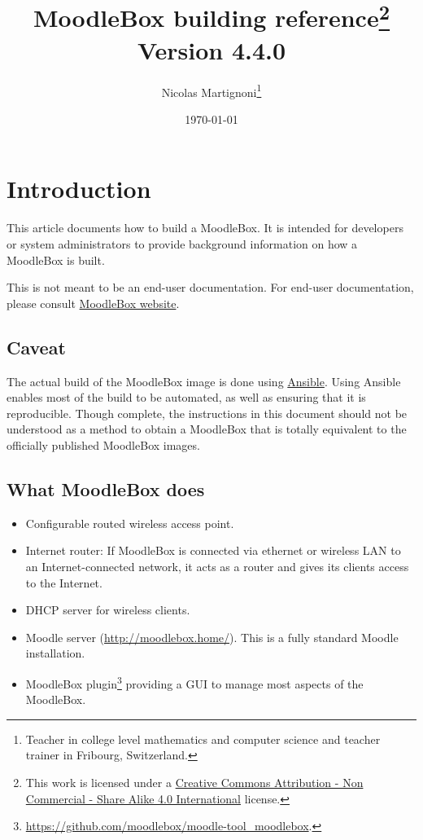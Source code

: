 \documentclass[12pt]{article}
\begin{document}
\title{MoodleBox building reference\footnote{This work is licensed under a \href{http://creativecommons.org/licenses/by-nc-sa/4.0/}{Creative Commons Attribution - Non Commercial - Share Alike  4.0 International} license.}\\
Version 4.4.0}
\date{\today} %
\author{Nicolas Martignoni\footnote{Teacher in college level mathematics and computer science and teacher trainer in Fribourg, Switzerland.}}
\maketitle

\begingroup
\setlength{\parskip}{3pt plus1pt minus1pt}
\tableofcontents
\endgroup
\clearpage

\section{Introduction}

This article documents how to build a MoodleBox.
It is intended for developers or system administrators to provide background information on how a MoodleBox is built.

This is not meant to be an end-user documentation.
For end-user documentation, please consult \href{https://moodlebox.net/}{MoodleBox website}.

\subsection{Caveat}

The actual build of the MoodleBox image is done using \href{https://www.ansible.com/}{Ansible}.
Using Ansible enables most of the build to be automated, as well as ensuring that it is reproducible.
Though complete, the instructions in this document should not be understood as a method to obtain a MoodleBox that is totally equivalent to the officially published MoodleBox images.

\subsection{What MoodleBox does}

\begin{itemize}
\item Configurable routed wireless access point.
\item Internet router: If MoodleBox is connected via ethernet or wireless LAN to an Internet-connected network, it acts as a router and gives its clients access to the Internet.
\item DHCP server for wireless clients.
\item Moodle server (\url{http://moodlebox.home/}).
This is a fully standard Moodle installation.
\item MoodleBox plugin\footnote{\url{https://github.com/moodlebox/moodle-tool_moodlebox}.} providing a GUI to manage most aspects of the MoodleBox.
\end{itemize}
\end{document}
